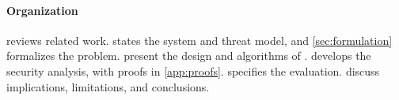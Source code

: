 \paragraph{Organization}
 reviews related work.  states the system and threat model, and \cref{sec:formulation} formalizes the problem.  present the design and algorithms of \PG{}.  develops the security analysis, with proofs in \cref{app:proofs}.  specifies the evaluation.  discuss implications, limitations, and conclusions.
